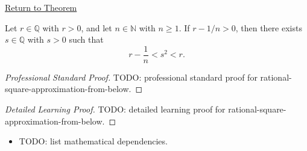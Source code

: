 \newpage
{}
\label{prf:rational-square-approximation-from-below}

\begin{remark*}[Return]
\hyperref[thm:rational-square-approximation-from-below]{Return to Theorem}
\end{remark*}

\begin{theorem*}
Let $r\in\mathbb{Q}$ with $r>0$, and let $n\in\mathbb{N}$ with $n\ge 1$.
If $r-1/n>0$, then there exists $s\in\mathbb{Q}$ with $s>0$ such that
\[
r-\frac1n<s^2<r.
\]
\end{theorem*}

\begin{proof}[Professional Standard Proof]
\LRAProofBodyStart
TODO: professional standard proof for rational-square-approximation-from-below.
\end{proof}

\begin{proof}[Detailed Learning Proof]
\LRAProofBodyStart
TODO: detailed learning proof for rational-square-approximation-from-below.
\end{proof}

\begin{remark*}
\end{remark*}

\begin{dependencies}
\begin{itemize}
  \item TODO: list mathematical dependencies.
\end{itemize}
\end{dependencies}

\clearpage
